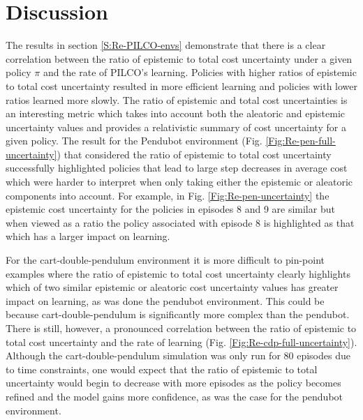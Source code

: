 \section{Discussion}
\label{S:Discussion}
The results in section \ref{S:Re-PILCO-envs} demonstrate that there is a clear correlation between the ratio of epistemic to total cost uncertainty under a given policy $\pi$ and the rate of PILCO's learning. Policies with higher ratios of epistemic to total cost uncertainty resulted in more efficient learning and policies with lower ratios learned more slowly. The ratio of epistemic and total cost uncertainties is an interesting metric which takes into account both the aleatoric and epistemic uncertainty values and provides a relativistic summary of cost uncertainty for a given policy. The result for the Pendubot environment (Fig. \ref{Fig:Re-pen-full-uncertainty}) that considered the ratio of epistemic to total cost uncertainty successfully highlighted policies that lead to large step decreases in average cost which were harder to interpret when only taking either the epistemic or aleatoric components into account. For example, in Fig. \ref{Fig:Re-pen-uncertainty} the epistemic cost uncertainty for the policies in episodes 8 and 9 are similar but when viewed as a ratio the policy associated with episode 8 is highlighted as that which has a larger impact on learning. 

For the cart-double-pendulum environment it is more difficult to pin-point examples where the ratio of epistemic to total cost uncertainty clearly highlights which of two similar epistemic or aleatoric cost uncertainty values has greater impact on learning, as was done the pendubot environment. This could be because cart-double-pendulum is significantly more complex than the pendubot. There is still, however, a pronounced correlation between the ratio of epistemic to total cost uncertainty and the rate of learning (Fig. \ref{Fig:Re-cdp-full-uncertainty}). Although the cart-double-pendulum simulation was only run for 80 episodes due to time constraints, one would expect that the ratio of epistemic to total uncertainty would begin to decrease with more episodes as the policy becomes refined and the model gains more confidence, as was the case for the pendubot environment.

